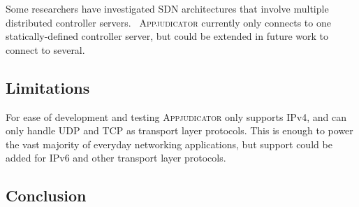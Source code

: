 Some researchers have investigated SDN architectures that involve multiple
distributed controller servers.~\cite{dixit2013, oktian2017}
\textsc{Appjudicator} currently only connects to one statically-defined
controller server, but could be extended in future work to connect to several.

\subsection{Limitations}
\label{sec:limitations}

For ease of development and testing \textsc{Appjudicator} only supports IPv4,
and can only handle UDP and TCP as transport layer protocols. This is enough to
power the vast majority of everyday networking applications, but support could
be added for IPv6 and other transport layer protocols.

\subsection{Conclusion}
\label{sec:conclusion}

\newpage

